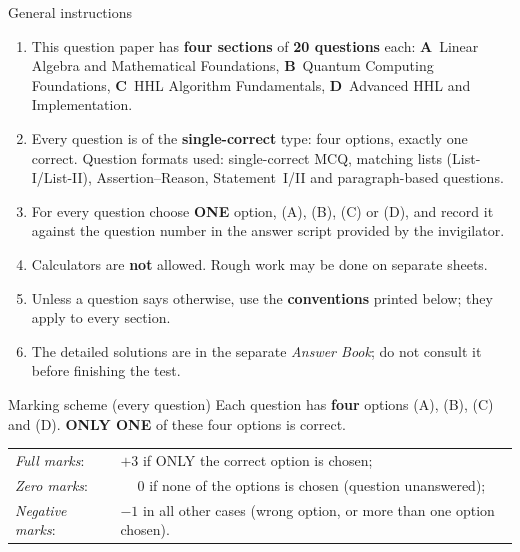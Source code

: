 \documentclass[11pt,a4paper]{article}
\begin{document}
\vspace{6pt}
\begin{infobox}{General instructions}
\begin{enumerate}[leftmargin=1.4em, itemsep=1pt, topsep=1pt]
\item This question paper has \textbf{four sections} of \textbf{20 questions} each:
\textbf{A}~Linear Algebra and Mathematical Foundations, \textbf{B}~Quantum Computing Foundations, \textbf{C}~HHL Algorithm Fundamentals, \textbf{D}~Advanced HHL and Implementation.
\item Every question is of the \textbf{single-correct} type: four options, exactly one correct. Question formats used:
single-correct MCQ, matching lists (List-I/List-II), Assertion--Reason, Statement~I/II and paragraph-based questions.
\item For every question choose \textbf{ONE} option, (A), (B), (C) or (D), and record it against the question number in the answer script provided by the invigilator.
\item Calculators are \textbf{not} allowed. Rough work may be done on separate sheets.
\item Unless a question says otherwise, use the \textbf{conventions} printed below; they apply to every section.
\item The detailed solutions are in the separate \emph{Answer Book}; do not consult it before finishing the test.
\end{enumerate}
\end{infobox}
\begin{infobox}{Marking scheme (every question)}
Each question has \textbf{four} options (A), (B), (C) and (D). \textbf{ONLY ONE} of these four options is correct.\\[2pt]
\begin{tabular}{@{}ll@{}}
\emph{Full marks}: & $+3$ if ONLY the correct option is chosen;\\
\emph{Zero marks}: & $\phantom{+}0$ if none of the options is chosen (question unanswered);\\
\emph{Negative marks}: & $-1$ in all other cases (wrong option, or more than one option chosen).
\end{tabular}
\end{infobox}
\end{document}
